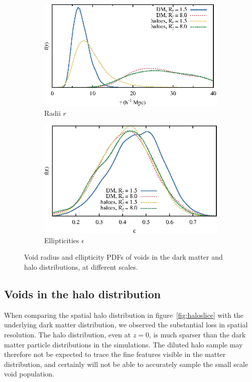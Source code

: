 \begin{figure}
  \begin{subfigure}[b]{\textwidth}
    \centering
    \includegraphics[width=\textwidth]{ch_voidsde/img/radii_haloes+scales}
    \caption{Radii $r$}
    \label{fig:radii-haloes-scales}
  \end{subfigure}
  \begin{subfigure}[b]{\textwidth}
    \centering
    \includegraphics[width=\textwidth]{ch_voidsde/img/ell_haloes+scales}
    \caption{Ellipticities $\epsilon$}
    \label{fig:ell-haloes-scales}
  \end{subfigure}
	\caption{Void radius and ellipticity PDFs of voids in the dark matter and halo distributions, at different scales.}
	\label{fig:shapes_haloes_scales}
\end{figure}

\subsection{Voids in the halo distribution}
When comparing the spatial halo distribution in figure~\ref{fig:haloslice} with the underlying dark matter distribution, we 
observed the substantial loss in spatial resolution. The halo distribution, even at $z=0$, is much sparser than the 
dark matter particle distributions in the simulations. The diluted halo sample may therefore not be expected to trace 
the fine features visible in the matter distribution, and certainly will not be able to accurately sample the 
small scale void population. 

